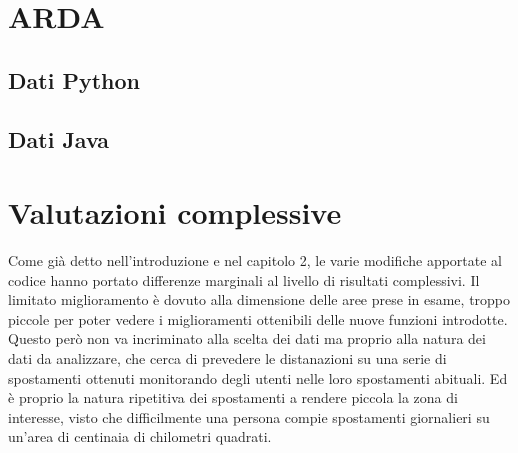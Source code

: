 \section{ARDA}
\subsection{Dati Python}
\subsection{Dati Java}

\section{Valutazioni complessive}
Come gi\`a detto nell'introduzione e nel capitolo 2, le varie modifiche apportate
al codice hanno portato differenze marginali al livello di risultati complessivi.
Il limitato miglioramento \`e dovuto alla dimensione delle aree prese in esame, troppo
piccole per poter vedere i miglioramenti ottenibili delle nuove funzioni introdotte.\\
Questo per\`o non va incriminato alla scelta dei dati ma proprio alla natura dei
dati da analizzare, che cerca di prevedere le distanazioni su una serie di spostamenti
ottenuti monitorando degli utenti nelle loro spostamenti abituali. Ed \`e proprio la
natura ripetitiva dei spostamenti a rendere piccola la zona di interesse, visto che
difficilmente una persona compie spostamenti giornalieri su un'area di centinaia di
chilometri quadrati.
